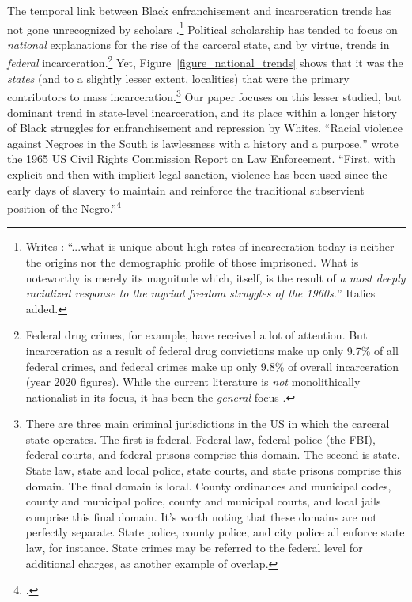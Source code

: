 \documentclass[12pt]{article}
\begin{document}
The temporal link between Black enfranchisement and incarceration trends has not gone unrecognized by scholars .\footnote{Writes : ``...what is unique about high rates of incarceration today is neither the origins nor the demographic profile of those imprisoned.  What is noteworthy is merely its magnitude which, itself, is the result of \emph{a most deeply racialized response to the myriad freedom struggles of the 1960s.}''  Italics added.}   Political scholarship has tended to focus on \emph{national} explanations for the rise of the carceral state, and by virtue, trends in \emph{federal} incarceration.\footnote{Federal drug crimes, for example, have received a lot of attention.  But incarceration as a result of federal drug convictions make up only 9.7\% of all federal crimes, and federal crimes make up only 9.8\% of overall incarceration (year 2020 figures).  While the current literature is \emph{not} monolithically nationalist in its focus, it has been the \emph{general} focus .  }  Yet, Figure~\ref{figure_national_trends} shows that it was the \emph{states} (and to a slightly lesser extent, localities) that were the primary contributors to mass incarceration.\footnote{There are three main criminal jurisdictions in the US in which the carceral state operates.  The first is federal.  Federal law, federal police (the FBI), federal courts, and federal prisons comprise this domain.  The second is state.  State law, state and local police, state courts, and state prisons comprise this domain.  The final domain is local.  County ordinances and municipal codes, county and municipal police, county and municipal courts, and local jails comprise this final domain.  It's worth noting that these domains are not perfectly separate. State police, county police, and city police all enforce state law, for instance.  State crimes may be referred to the federal level for additional charges, as another example of overlap.}  Our paper focuses on this lesser studied, but dominant trend in state-level incarceration, and its place within a longer history of Black struggles for enfranchisement and repression by Whites.  ``Racial violence against Negroes in the South is lawlessness with a history and a purpose,'' wrote the 1965 US Civil Rights Commission Report on Law Enforcement.  ``First, with explicit and then with implicit legal sanction, violence has been used since the early days of slavery to maintain and reinforce the traditional subservient position of the Negro.''\footnote{.}
\end{document}

